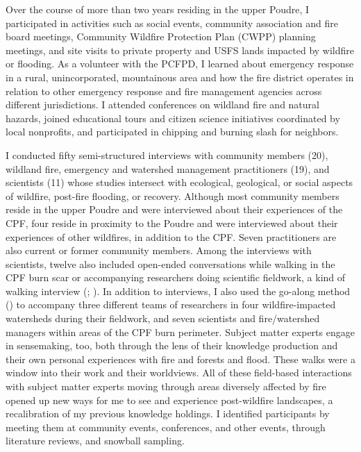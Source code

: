 \documentclass[
]{article}
\begin{document}
Over the course of more than two years residing in the upper Poudre, I participated in activities such as social events, community association and fire board meetings, Community Wildfire Protection Plan (CWPP) planning meetings, and site visits to private property and USFS lands impacted by wildfire or flooding. As a volunteer with the PCFPD, I learned about emergency response in a rural, unincorporated, mountainous area and how the fire district operates in relation to other emergency response and fire management agencies across different jurisdictions. I attended conferences on wildland fire and natural hazards, joined educational tours and citizen science initiatives coordinated by local nonprofits, and participated in chipping and burning slash for neighbors.

I conducted fifty semi-structured interviews with community members (20), wildland fire, emergency and watershed management practitioners (19), and scientists (11) whose studies intersect with ecological, geological, or social aspects of wildfire, post-fire flooding, or recovery. Although most community members reside in the upper Poudre and were interviewed about their experiences of the CPF, four reside in proximity to the Poudre and were interviewed about their experiences of other wildfires, in addition to the CPF. Seven practitioners are also current or former community members. Among the interviews with scientists, twelve also included open-ended conversations while walking in the CPF burn scar or accompanying researchers doing scientific fieldwork, a kind of walking interview (; ). In addition to interviews, I also used the go-along method () to accompany three different teams of researchers in four wildfire-impacted watersheds during their fieldwork, and seven scientists and fire/watershed managers within areas of the CPF burn perimeter. Subject matter experts engage in sensemaking, too, both through the lens of their knowledge production and their own personal experiences with fire and forests and flood. These walks were a window into their work and their worldviews. All of these field-based interactions with subject matter experts moving through areas diversely affected by fire opened up new ways for me to see and experience post-wildfire landscapes, a recalibration of my previous knowledge holdings. I identified participants by meeting them at community events, conferences, and other events, through literature reviews, and snowball sampling.
\end{document}
